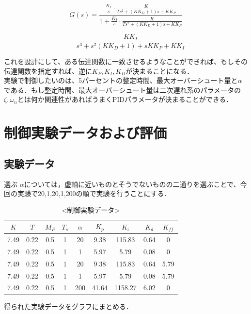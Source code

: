 \documentclass[xelatex,ja=standard,jafont=noto]{bxjsarticle}
\numberwithin{figure}{section}
\begin{document}
\begin{equation}
    G(s)=\frac{\frac{K_{I}}{s}\cdot\frac{K}{Ts^{2}+(KK_{D}+1)s+KK_{P}}}{1+\frac{K_{I}}{s}\cdot\frac{K}{Ts^{2}+(KK_{D}+1)s+KK_{P}}}
\end{equation}

\begin{equation}
    =\frac{KK_{I}}{s^{3}+s^{2}(KK_{D}+1)+sKK_{P}+KK_{I}}
\end{equation}

これを設計にして、ある伝達関数に一致させるようなことができれば、もしその伝達関数を指定すれば、逆に$K_{P},K_{I},K_{D}$が決まることになる．\\


    実験で制御したいのは、5パーセントの整定時間、最大オーバーシュート量と$\alpha$である．もし整定時間、最大オーバーシュート量は二次遅れ系のパラメータの$\zeta,\omega_{n}$とは何か関連性があればうまくPIDパラメータが決まることができる．
    
\section{制御実験データおよび評価}

\subsection{実験データ}

選ぶ $\alpha$については，虚軸に近いものとそうでないものの二通りを選ぶことで、今回の実験で20,1,20,1,200の順で実験を行うことにする．

\begin{table}[!htbp]
\centering
\caption{<制御実験データ>}
\begin{tabular}{ccccccccc}
\hline
 $ K$ & $T$ & $M_{P}$ & $T_{s}$& $\alpha$ & $K_{p}$&$K_{i}$&$K_{d}$&$K_{ff}$\\
\hline
7.49& 0.22 & 0.5& 1 & 20 & 9.38 & 115.83 & 0.64 &0\\
\hline
 7.49&  0.22&  0.5& 1 &1 &5.97 &5.79 & 0.08&0 \\
 \hline
7.49 &  0.22& 0.5 &1 &20 & 9.38 & 115.83& 0.64&5.79\\
\hline
7.49 &  0.22& 0.5 &1 &1 & 5.97 & 5.79& 0.08 &5.79\\
\hline
7.49 &  0.22& 0.5 &1 &200 & 41.64&1158.27 & 6.02 &0\\
\hline
\end{tabular}
\end{table}


得られた実験データをグラフにまとめる．
\end{document}
